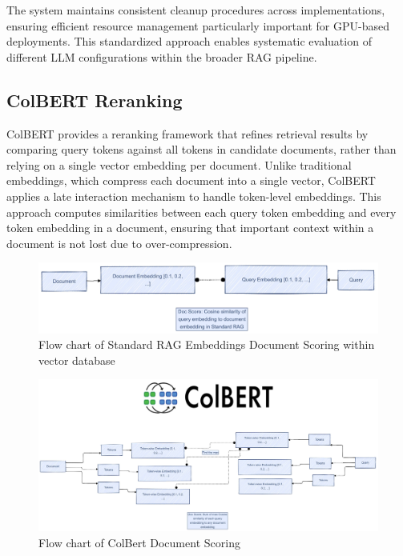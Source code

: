 \documentclass{scrartcl}
\begin{document}
The system maintains consistent cleanup procedures across implementations, ensuring efficient resource management particularly important for GPU-based deployments. This standardized approach enables systematic evaluation of different LLM configurations within the broader RAG pipeline.



\subsection{ColBERT Reranking}
ColBERT \cite{khattab2020colbert} provides a reranking framework that refines retrieval results by comparing query tokens against all tokens in candidate documents, rather than relying on a single vector embedding per document. Unlike traditional embeddings, which compress each document into a single vector, ColBERT applies a late interaction mechanism to handle token-level embeddings. This approach computes similarities between each query token embedding and every token embedding in a document, ensuring that important context within a document is not lost due to over-compression.


\begin{figure}[H]
	\centering
	\includegraphics[width=\linewidth]{StandardRAGDocumentScoring.pdf}
	\caption{Flow chart of Standard RAG Embeddings Document Scoring within vector database}
	\label{fig:standard_doc_scoring}
\end{figure}

\begin{figure}[H]
	\centering
	\includegraphics[width=\linewidth]{Colbert.pdf}
	\caption{Flow chart of ColBert Document Scoring}
	\label{fig:colbert}
\end{figure}
\end{document}
